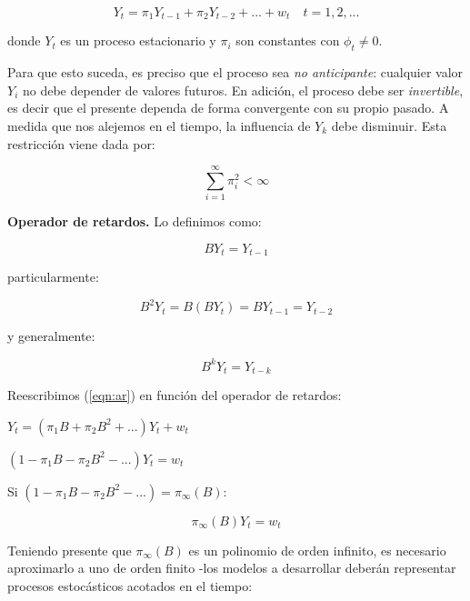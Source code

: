 \documentclass[a4paper,10pt]{article}
\begin{document}
\begin{equation}\label{eqn:ar}
Y_t = \pi_1 Y_{t-1} + \pi_2 Y_{t-2} + ... + w_t \quad t=1,2,...
\end{equation}

donde $Y_t$ es un proceso estacionario y $\pi_i$ son constantes con $\phi_t \neq 0$.

Para que esto suceda, es preciso que el proceso sea \textit{no anticipante}: cualquier valor $Y_i$ no debe depender de valores futuros. En adición, el proceso debe ser \textit{invertible}, es decir que el presente dependa de forma convergente con su propio pasado. A medida que nos alejemos en el tiempo, la influencia de $Y_k$ debe disminuir. Esta restricción viene dada por:

\begin{equation*}
 \sum_{i=1}^\infty \pi_i^2 < \infty
\end{equation*}


\textbf{Operador de retardos.} Lo definimos como:

\begin{equation}
BY_t = Y_{t-1}
\end{equation}

particularmente:

\begin{equation*}
B^2Y_t = B(BY_t) = BY_{t-1} = Y_{t-2}
\end{equation*}

y generalmente:

\begin{equation}
B^kY_t = Y_{t-k}
\end{equation}

Reescribimos (\ref{eqn:ar}) en función del operador de retardos:

\begin{center}
$Y_t = (\pi_1B + \pi_2B^2 + ...) Y_t + w_t$

$(1-\pi_1B - \pi_2 B^2 - ...) Y_t = w_t$
\end{center}

Si $(1-\pi_1B - \pi_2 B^2 - ...) = \pi_\infty(B)$:

\begin{equation}\label{eqn:infinit}
\pi_\infty(B)Y_t = w_t
\end{equation}

Teniendo presente que $\pi_\infty(B)$ es un polinomio de orden infinito, es necesario aproximarlo a uno de orden finito -los modelos a desarrollar deberán representar procesos estocásticos acotados en el tiempo:
\end{document}
